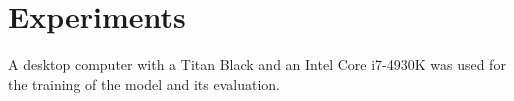 
\section{Experiments}\label{sec:experiments}

A desktop computer with a Titan Black and an Intel Core i7-4930K was used for
the training of the model and its evaluation.





